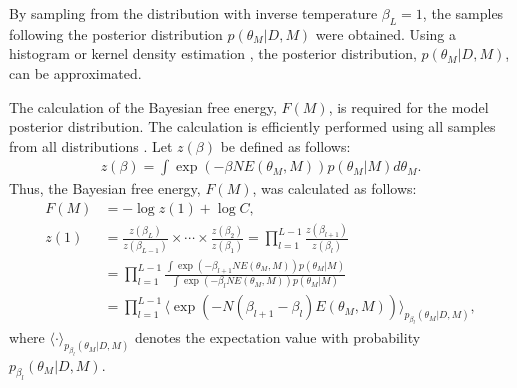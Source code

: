 \documentclass[12pt]{article}
\begin{document}
By sampling from the distribution with inverse temperature $\beta_L = 1$, the samples following the posterior distribution $p(\theta_M|D, M)$ were obtained.
Using a histogram or kernel density estimation \cite{PRML}, the posterior distribution, $p(\theta_M|D, M)$, can be approximated. \par
The calculation of the Bayesian free energy, $F(M)$, is required for the model posterior distribution.
The calculation is efficiently performed using all samples from all distributions \cite{neal1993probabilistic}.
Let $z(\beta)$ be defined as follows:
\begin{align}
  z(\beta) = \int \exp(-\beta NE(\theta_M, M))p(\theta_M|M)d\theta_M.
\end{align}
Thus, the Bayesian free energy, $F(M)$, was calculated as follows:
\begin{align}
  F(M) &= -\log z(1) + \log C, \\
  z(1)  &= \frac{z(\beta_L)}{z(\beta_{L-1})} \times \cdots \times \frac{z(\beta_2)}{z(\beta_1)} = \prod_{l=1}^{L-1} \frac{z(\beta_{l+1})}{z(\beta_l)} \\
       &= \prod_{l=1}^{L-1} \frac{\int \exp(-\beta_{l+1} NE(\theta_M, M))p(\theta_M|M)}{\int \exp(-\beta_l NE(\theta_M, M))p(\theta_M|M)} \\
       &= \prod_{l=1}^{L-1} \langle\exp(-N(\beta_{l+1} - \beta_{l})E(\theta_M,M))\rangle_{p_{\beta_l}(\theta_M|D,M)},
\end{align}
where $\langle \cdot \rangle_{p_{\beta_l}(\theta_M|D,M)}$ denotes the expectation value with probability $p_{\beta_l}(\theta_M|D,M)$.
\end{document}
